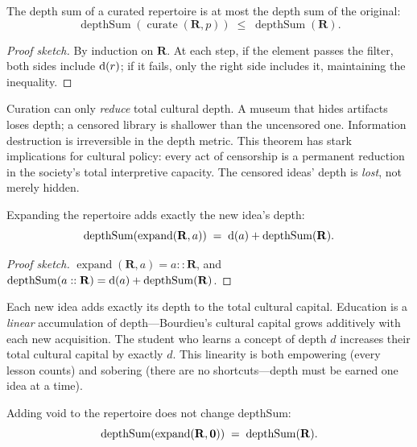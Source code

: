 \begin{theorem}
\label{thm:curated-depthsum}
The depth sum of a curated repertoire is at most the depth sum of the
original:
\[
  \operatorname{depthSum}(\operatorname{curate}(\mathbf{R}, p))
  \;\le\;
  \operatorname{depthSum}(\mathbf{R}).
\]
\end{theorem}

\begin{proof}[Proof sketch]
By induction on $\mathbf{R}$.  At each step, if the element passes the
filter, both sides include $\operatorname{d}(r)$; if it fails, only the right side
includes it, maintaining the inequality.
\end{proof}

Curation can only \emph{reduce} total cultural depth.  A museum that hides
artifacts loses depth; a censored library is shallower than the uncensored
one.  Information destruction is irreversible in the depth metric.  This
theorem has stark implications for cultural policy: every act of censorship
is a permanent reduction in the society's total interpretive capacity.  The
censored ideas' depth is \emph{lost}, not merely hidden.

\begin{theorem}
\label{thm:expanded-depthsum}
Expanding the repertoire adds exactly the new idea's depth:
\[
  \operatorname{depthSum}(\operatorname{expand}(\mathbf{R}, a))
  \;=\;
  \operatorname{d}(a) + \operatorname{depthSum}(\mathbf{R}).
\]
\end{theorem}

\begin{proof}[Proof sketch]
$\operatorname{expand}(\mathbf{R}, a) = a :: \mathbf{R}$, and
$\operatorname{depthSum}(a :: \mathbf{R}) = \operatorname{d}(a) +
\operatorname{depthSum}(\mathbf{R})$.
\end{proof}

Each new idea adds exactly its depth to the total cultural capital.
Education is a \emph{linear} accumulation of depth---Bourdieu's cultural
capital grows additively with each new acquisition.  The student who learns
a concept of depth $d$ increases their total cultural capital by exactly $d$.
This linearity is both empowering (every lesson counts) and sobering (there
are no shortcuts---depth must be earned one idea at a time).

\begin{theorem}
\label{thm:void-expansion-depth}
Adding void to the repertoire does not change depthSum:
\[
  \operatorname{depthSum}(\operatorname{expand}(\mathbf{R}, \mathbf{0}))
  \;=\;
  \operatorname{depthSum}(\mathbf{R}).
\]
\end{theorem}

